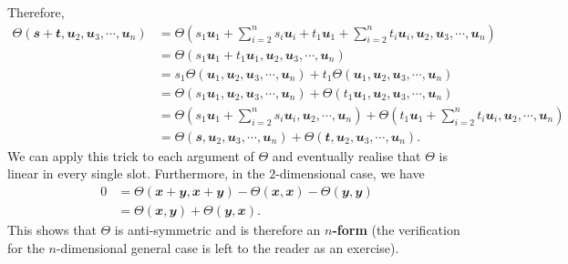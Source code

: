 \documentclass[math]{amznotes}
\theoremstyle{remark}
\begin{document}
Therefore, 
\begin{align*}
    \Theta(\mathbfit{s} + \mathbfit{t}, \mathbfit{u}_2, \mathbfit{u}_3, \cdots, \mathbfit{u}_n) & = \Theta\left(s_1\mathbfit{u}_1 + \sum_{i = 2}^{n}s_i\mathbfit{u}_i + t_1\mathbfit{u}_1 + \sum_{i = 2}^{n}t_i\mathbfit{u}_i, \mathbfit{u}_2, \mathbfit{u}_3, \cdots, \mathbfit{u}_n\right) \\
    & = \Theta\left(s_1\mathbfit{u}_1 + t_1\mathbfit{u}_1, \mathbfit{u}_2, \mathbfit{u}_3, \cdots, \mathbfit{u}_n\right) \\
    & = s_1\Theta\left(\mathbfit{u}_1, \mathbfit{u}_2, \mathbfit{u}_3, \cdots, \mathbfit{u}_n\right) + t_1\Theta\left(\mathbfit{u}_1, \mathbfit{u}_2, \mathbfit{u}_3, \cdots, \mathbfit{u}_n\right) \\
    & = \Theta\left(s_1\mathbfit{u}_1, \mathbfit{u}_2, \mathbfit{u}_3, \cdots, \mathbfit{u}_n\right) + \Theta\left(t_1\mathbfit{u}_1, \mathbfit{u}_2, \mathbfit{u}_3, \cdots, \mathbfit{u}_n\right) \\
    & = \Theta\left(s_1\mathbfit{u}_1 + \sum_{i = 2}^{n}s_i\mathbfit{u}_i, \mathbfit{u}_2, \cdots, \mathbfit{u}_n\right) + \Theta\left(t_1\mathbfit{u}_1 + \sum_{i = 2}^{n}t_i\mathbfit{u}_i, \mathbfit{u}_2, \cdots, \mathbfit{u}_n\right) \\
    & =  \Theta\left(\mathbfit{s}, \mathbfit{u}_2, \mathbfit{u}_3, \cdots, \mathbfit{u}_n\right) +  \Theta\left(\mathbfit{t}, \mathbfit{u}_2, \mathbfit{u}_3, \cdots, \mathbfit{u}_n\right).
\end{align*}
We can apply this trick to each argument of $\Theta$ and eventually realise that $\Theta$ is linear in every single slot. Furthermore, in the $2$-dimensional case, we have 
\begin{align*}
    0 & = \Theta\left(\mathbfit{x} + \mathbfit{y}, \mathbfit{x} + \mathbfit{y}\right) - \Theta\left(\mathbfit{x}, \mathbfit{x}\right) - \Theta\left(\mathbfit{y}, \mathbfit{y}\right) \\
    & = \Theta\left(\mathbfit{x}, \mathbfit{y}\right) + \Theta\left(\mathbfit{y}, \mathbfit{x}\right).
\end{align*}
This shows that $\Theta$ is anti-symmetric and is therefore an \textbf{$n$-form} (the verification for the $n$-dimensional general case is left to the reader as an exercise).
\end{document}
